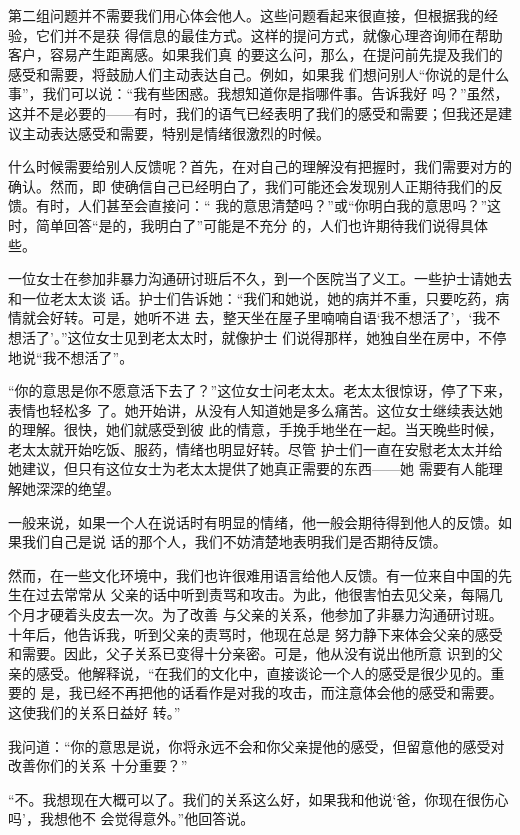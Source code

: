 \documentclass{ctexart}
\begin{document}
第二组问题并不需要我们用心体会他人。这些问题看起来很直接，但根据我的经验，它们并不是获
得信息的最佳方式。这样的提问方式，就像心理咨询师在帮助客户，容易产生距离感。如果我们真
的要这么问，那么，在提问前先提及我们的感受和需要，将鼓励人们主动表达自己。例如，如果我
们想问别人``你说的是什么事''，我们可以说：``我有些困惑。我想知道你是指哪件事。告诉我好
吗？''虽然，这并不是必要的------有时，我们的语气已经表明了我们的感受和需要；但我还是建
议主动表达感受和需要，特别是情绪很激烈的时候。

什么时候需要给别人反馈呢？首先，在对自己的理解没有把握时，我们需要对方的确认。然而，即
使确信自己已经明白了，我们可能还会发现别人正期待我们的反馈。有时，人们甚至会直接问：``
我的意思清楚吗？''或``你明白我的意思吗？''这时，简单回答``是的，我明白了''可能是不充分
的，人们也许期待我们说得具体些。

一位女士在参加非暴力沟通研讨班后不久，到一个医院当了义工。一些护士请她去和一位老太太谈
话。护士们告诉她：``我们和她说，她的病并不重，只要吃药，病情就会好转。可是，她听不进
去，整天坐在屋子里喃喃自语`我不想活了'，`我不想活了'。''这位女士见到老太太时，就像护士
们说得那样，她独自坐在房中，不停地说``我不想活了''。

``你的意思是你不愿意活下去了？''这位女士问老太太。老太太很惊讶，停了下来，表情也轻松多
了。她开始讲，从没有人知道她是多么痛苦。这位女士继续表达她的理解。很快，她们就感受到彼
此的情意，手挽手地坐在一起。当天晚些时候，老太太就开始吃饭、服药，情绪也明显好转。尽管
护士们一直在安慰老太太并给她建议，但只有这位女士为老太太提供了她真正需要的东西------她
需要有人能理解她深深的绝望。

一般来说，如果一个人在说话时有明显的情绪，他一般会期待得到他人的反馈。如果我们自己是说
话的那个人，我们不妨清楚地表明我们是否期待反馈。

然而，在一些文化环境中，我们也许很难用语言给他人反馈。有一位来自中国的先生在过去常常从
父亲的话中听到责骂和攻击。为此，他很害怕去见父亲，每隔几个月才硬着头皮去一次。为了改善
与父亲的关系，他参加了非暴力沟通研讨班。十年后，他告诉我，听到父亲的责骂时，他现在总是
努力静下来体会父亲的感受和需要。因此，父子关系已变得十分亲密。可是，他从没有说出他所意
识到的父亲的感受。他解释说，``在我们的文化中，直接谈论一个人的感受是很少见的。重要的
是，我已经不再把他的话看作是对我的攻击，而注意体会他的感受和需要。这使我们的关系日益好
转。''

我问道：``你的意思是说，你将永远不会和你父亲提他的感受，但留意他的感受对改善你们的关系
十分重要？''

``不。我想现在大概可以了。我们的关系这么好，如果我和他说`爸，你现在很伤心吗'，我想他不
会觉得意外。''他回答说。
\end{document}
